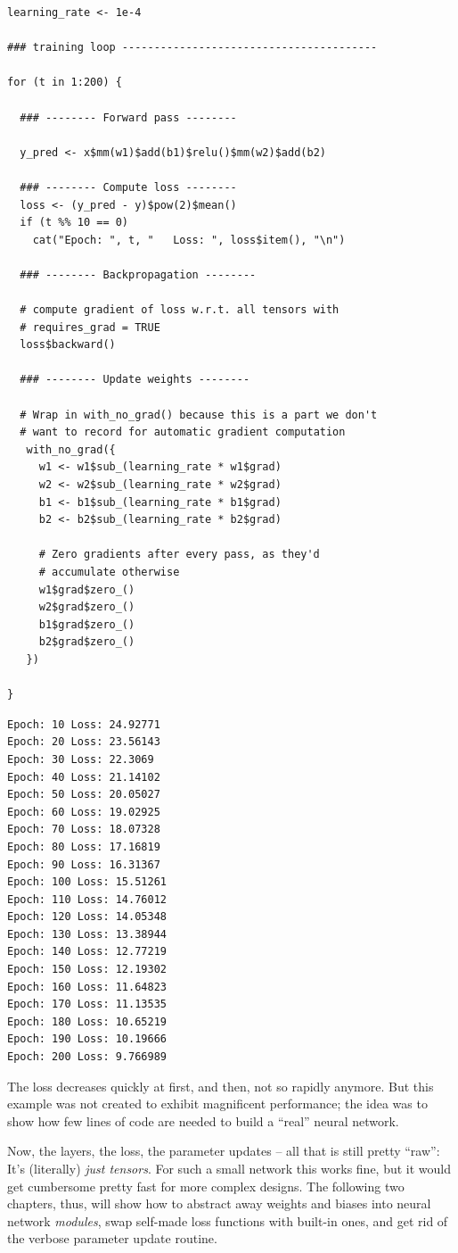 \documentclass[
  letterpaper,
]{krantz}
\begin{document}
\begin{verbatim}
learning_rate <- 1e-4

### training loop ----------------------------------------

for (t in 1:200) {
  
  ### -------- Forward pass --------
  
  y_pred <- x$mm(w1)$add(b1)$relu()$mm(w2)$add(b2)
  
  ### -------- Compute loss -------- 
  loss <- (y_pred - y)$pow(2)$mean()
  if (t %% 10 == 0)
    cat("Epoch: ", t, "   Loss: ", loss$item(), "\n")
  
  ### -------- Backpropagation --------
  
  # compute gradient of loss w.r.t. all tensors with
  # requires_grad = TRUE
  loss$backward()
  
  ### -------- Update weights -------- 
  
  # Wrap in with_no_grad() because this is a part we don't 
  # want to record for automatic gradient computation
   with_no_grad({
     w1 <- w1$sub_(learning_rate * w1$grad)
     w2 <- w2$sub_(learning_rate * w2$grad)
     b1 <- b1$sub_(learning_rate * b1$grad)
     b2 <- b2$sub_(learning_rate * b2$grad)  
     
     # Zero gradients after every pass, as they'd
     # accumulate otherwise
     w1$grad$zero_()
     w2$grad$zero_()
     b1$grad$zero_()
     b2$grad$zero_()  
   })

}
\end{verbatim}

\begin{verbatim}
Epoch: 10 Loss: 24.92771
Epoch: 20 Loss: 23.56143
Epoch: 30 Loss: 22.3069
Epoch: 40 Loss: 21.14102
Epoch: 50 Loss: 20.05027
Epoch: 60 Loss: 19.02925
Epoch: 70 Loss: 18.07328
Epoch: 80 Loss: 17.16819
Epoch: 90 Loss: 16.31367
Epoch: 100 Loss: 15.51261
Epoch: 110 Loss: 14.76012
Epoch: 120 Loss: 14.05348
Epoch: 130 Loss: 13.38944
Epoch: 140 Loss: 12.77219
Epoch: 150 Loss: 12.19302
Epoch: 160 Loss: 11.64823
Epoch: 170 Loss: 11.13535
Epoch: 180 Loss: 10.65219
Epoch: 190 Loss: 10.19666
Epoch: 200 Loss: 9.766989
\end{verbatim}

The loss decreases quickly at first, and then, not so rapidly anymore.
But this example was not created to exhibit magnificent performance; the
idea was to show how few lines of code are needed to build a ``real''
neural network.

Now, the layers, the loss, the parameter updates -- all that is still
pretty ``raw'': It's (literally) \emph{just tensors}. For such a small
network this works fine, but it would get cumbersome pretty fast for
more complex designs. The following two chapters, thus, will show how to
abstract away weights and biases into neural network \emph{modules},
swap self-made loss functions with built-in ones, and get rid of the
verbose parameter update routine.
\end{document}
